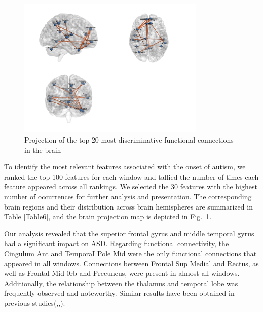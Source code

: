 \documentclass[a4paper]{cas-dc}
\newcommand{\figref}[1]{Fig.~\ref{#1}}
\begin{document}
\begin{figure}[h]
	\centering
	\includegraphics[width=0.8\textwidth]{imgs/brain.png}
	\caption{Projection of the top 20 most discriminative functional connections in the brain}
	\label{fig3}
\end{figure} 

To identify the most relevant features associated with the onset of autism, we ranked the top 100 features for each window and tallied the number of times each feature appeared across all rankings. We selected the 30 features with the highest number of occurrences for further analysis and presentation. The corresponding brain regions and their distribution across brain hemispheres are summarized in Table \ref{Table6}, and the brain projection map is depicted in \figref{fig3}.

Our analysis revealed that the superior frontal gyrus and middle temporal gyrus had a significant impact on ASD. Regarding functional connectivity, the Cingulum Ant and TemporaI Pole Mid were the only functional connections that appeared in all windows. Connections between Frontal Sup Medial and Rectus, as well as Frontal Mid 0rb and Precuneus, were present in almost all windows. Additionally, the relationship between the thalamus and temporal lobe was frequently observed and noteworthy. Similar results have been obtained in previous studies(\cite{wang2021autistic},\cite{monk2009abnormalities},\cite{xu2020specific}).
\end{document}
